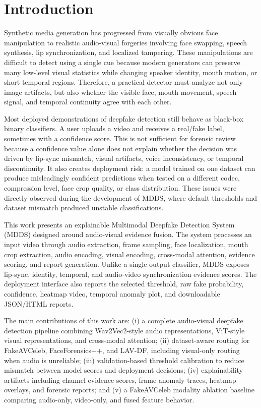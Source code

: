 \documentclass[conference]{IEEEtran}
\begin{document}
\section{Introduction}
Synthetic media generation has progressed from visually obvious face manipulation to realistic audio-visual forgeries involving face swapping, speech synthesis, lip synchronization, and localized tampering. These manipulations are difficult to detect using a single cue because modern generators can preserve many low-level visual statistics while changing speaker identity, mouth motion, or short temporal regions. Therefore, a practical detector must analyze not only image artifacts, but also whether the visible face, mouth movement, speech signal, and temporal continuity agree with each other.

Most deployed demonstrations of deepfake detection still behave as black-box binary classifiers. A user uploads a video and receives a real/fake label, sometimes with a confidence score. This is not sufficient for forensic review because a confidence value alone does not explain whether the decision was driven by lip-sync mismatch, visual artifacts, voice inconsistency, or temporal discontinuity. It also creates deployment risk: a model trained on one dataset can produce misleadingly confident predictions when tested on a different codec, compression level, face crop quality, or class distribution. These issues were directly observed during the development of MDDS, where default thresholds and dataset mismatch produced unstable classifications.

This work presents an explainable Multimodal Deepfake Detection System (MDDS) designed around audio-visual evidence fusion. The system processes an input video through audio extraction, frame sampling, face localization, mouth crop extraction, audio encoding, visual encoding, cross-modal attention, evidence scoring, and report generation. Unlike a single-output classifier, MDDS exposes lip-sync, identity, temporal, and audio-video synchronization evidence scores. The deployment interface also reports the selected threshold, raw fake probability, confidence, heatmap video, temporal anomaly plot, and downloadable JSON/HTML reports.

The main contributions of this work are: (i) a complete audio-visual deepfake detection pipeline combining Wav2Vec2-style audio representations, ViT-style visual representations, and cross-modal attention; (ii) dataset-aware routing for FakeAVCeleb, FaceForensics++, and LAV-DF, including visual-only routing when audio is unreliable; (iii) validation-based threshold calibration to reduce mismatch between model scores and deployment decisions; (iv) explainability artifacts including channel evidence scores, frame anomaly traces, heatmap overlays, and forensic reports; and (v) a FakeAVCeleb modality ablation baseline comparing audio-only, video-only, and fused feature behavior.
\end{document}

